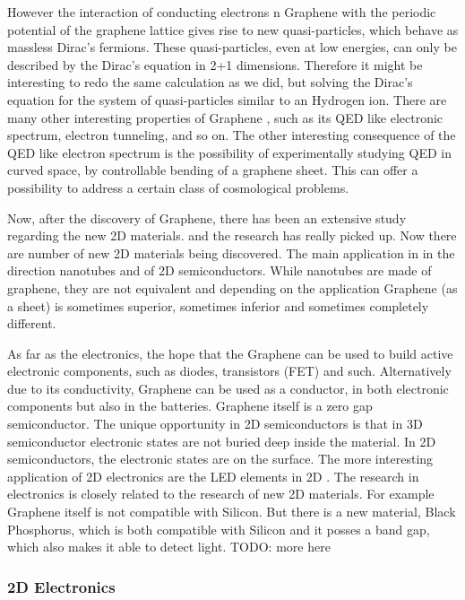 However the interaction of conducting electrons n Graphene with the periodic potential of the graphene lattice gives rise to new quasi-particles, which behave as massless Dirac's fermions. These quasi-particles, even at low energies, can only be described by the Dirac's equation in 2+1 dimensions. Therefore it might be interesting to redo the same calculation as we did, but solving the Dirac's equation for the system of quasi-particles similar to an Hydrogen ion.  There are many other interesting properties of Graphene \cite{Graphene0}, such as its QED like electronic spectrum, electron tunneling, and so on. The other interesting consequence of the QED like electron spectrum is the possibility of experimentally studying QED in curved space, by controllable bending of a graphene sheet. This can offer a possibility to address a certain class of cosmological problems. 

Now, after the discovery of Graphene, there has been an extensive study regarding the new 2D materials. and the research has really picked up. Now there are number of new 2D materials being discovered.  The main application in in the direction nanotubes and of 2D semiconductors. While nanotubes are made of graphene, they are not equivalent and depending on the application Graphene (as a sheet) is sometimes superior, sometimes inferior and sometimes completely different.

As far as the electronics, the hope that the Graphene can be used to build active electronic components, such as diodes, transistors (FET) and such. Alternatively due to its conductivity, Graphene can be used as a conductor, in both electronic components but also in the batteries. Graphene itself is a zero gap semiconductor. The unique opportunity in 2D semiconductors is that in 3D semiconductor electronic states are not buried deep inside the material. In 2D semiconductors, the electronic states are on the surface. The more interesting application of 2D electronics are the LED elements in 2D \cite{2DLED}. The research in electronics is closely related to the research of new 2D materials. For example Graphene itself is not compatible with Silicon. But there is a new material, Black Phosphorus, which is both compatible with Silicon and it posses a band gap, which also makes it able to detect light. TODO: more here

\subsubsection*{2D Electronics}

